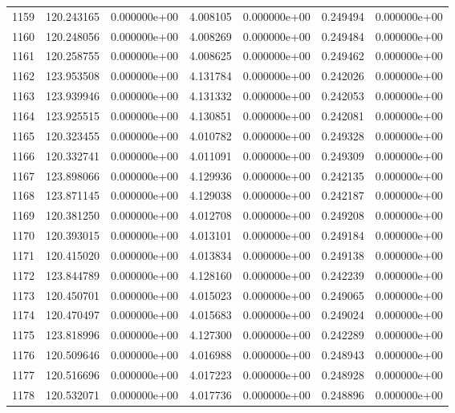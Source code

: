 \begin{tabular}{rrrrrrr}
1159 & 120.243165 &  0.000000e+00 &  4.008105 &  0.000000e+00 &    0.249494 &  0.000000e+00 \\
1160 & 120.248056 &  0.000000e+00 &  4.008269 &  0.000000e+00 &    0.249484 &  0.000000e+00 \\
1161 & 120.258755 &  0.000000e+00 &  4.008625 &  0.000000e+00 &    0.249462 &  0.000000e+00 \\
1162 & 123.953508 &  0.000000e+00 &  4.131784 &  0.000000e+00 &    0.242026 &  0.000000e+00 \\
1163 & 123.939946 &  0.000000e+00 &  4.131332 &  0.000000e+00 &    0.242053 &  0.000000e+00 \\
1164 & 123.925515 &  0.000000e+00 &  4.130851 &  0.000000e+00 &    0.242081 &  0.000000e+00 \\
1165 & 120.323455 &  0.000000e+00 &  4.010782 &  0.000000e+00 &    0.249328 &  0.000000e+00 \\
1166 & 120.332741 &  0.000000e+00 &  4.011091 &  0.000000e+00 &    0.249309 &  0.000000e+00 \\
1167 & 123.898066 &  0.000000e+00 &  4.129936 &  0.000000e+00 &    0.242135 &  0.000000e+00 \\
1168 & 123.871145 &  0.000000e+00 &  4.129038 &  0.000000e+00 &    0.242187 &  0.000000e+00 \\
1169 & 120.381250 &  0.000000e+00 &  4.012708 &  0.000000e+00 &    0.249208 &  0.000000e+00 \\
1170 & 120.393015 &  0.000000e+00 &  4.013101 &  0.000000e+00 &    0.249184 &  0.000000e+00 \\
1171 & 120.415020 &  0.000000e+00 &  4.013834 &  0.000000e+00 &    0.249138 &  0.000000e+00 \\
1172 & 123.844789 &  0.000000e+00 &  4.128160 &  0.000000e+00 &    0.242239 &  0.000000e+00 \\
1173 & 120.450701 &  0.000000e+00 &  4.015023 &  0.000000e+00 &    0.249065 &  0.000000e+00 \\
1174 & 120.470497 &  0.000000e+00 &  4.015683 &  0.000000e+00 &    0.249024 &  0.000000e+00 \\
1175 & 123.818996 &  0.000000e+00 &  4.127300 &  0.000000e+00 &    0.242289 &  0.000000e+00 \\
1176 & 120.509646 &  0.000000e+00 &  4.016988 &  0.000000e+00 &    0.248943 &  0.000000e+00 \\
1177 & 120.516696 &  0.000000e+00 &  4.017223 &  0.000000e+00 &    0.248928 &  0.000000e+00 \\
1178 & 120.532071 &  0.000000e+00 &  4.017736 &  0.000000e+00 &    0.248896 &  0.000000e+00 \\

\end{tabular}
